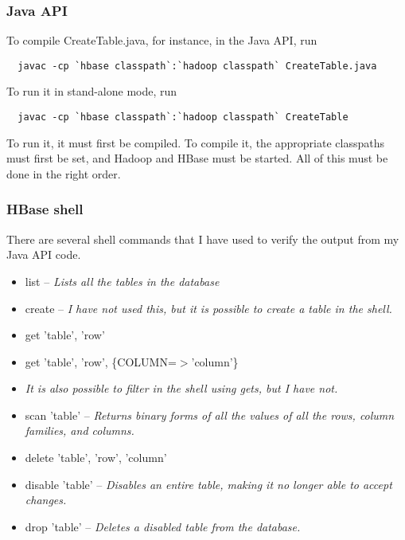 \documentclass{article}
\begin{document}
\subsubsection{Java API}
To compile CreateTable.java, for instance, in the Java API, run
\begin{lstlisting}
  javac -cp `hbase classpath`:`hadoop classpath` CreateTable.java
\end{lstlisting}

To run it in stand-alone mode, run
\begin{lstlisting}
  javac -cp `hbase classpath`:`hadoop classpath` CreateTable
\end{lstlisting}

To run it, it must first be compiled. To compile it, the appropriate
classpaths must first be set, and Hadoop and HBase must be
started. All of this must be done in the right order.

\subsubsection{HBase shell}
There are several shell commands that I have used to verify the output from my Java API code.

\begin{itemize}
\item list -- {\it Lists all the tables in the database}
\item create -- {\it I have not used this, but it is possible to create a table in the shell.}
\item get 'table', 'row'
\item get 'table', 'row', \{COLUMN=$>$'column'\}
\item {\it It is also possible to filter in the shell using gets, but I have not.}
\item scan 'table' -- {\it Returns binary forms of all the values of all the rows, column families, and columns.}
\item delete 'table', 'row', 'column'
\item disable 'table' -- {\it Disables an entire table, making it no longer able to accept changes.}
\item drop 'table' -- {\it Deletes a disabled table from the database.}
  \end{itemize}
  
\end{document}
